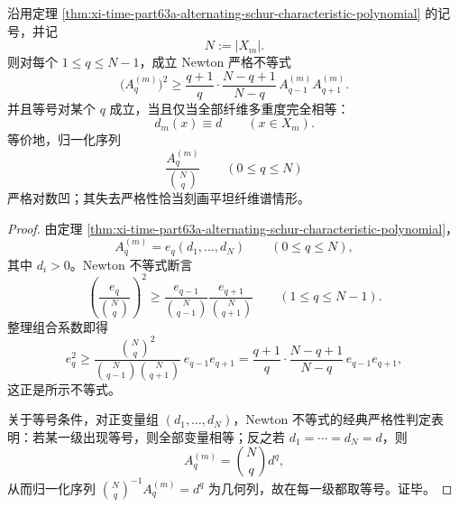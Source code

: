 \begin{theorem}\label{thm:xi-time-part63a-alternating-schur-newton-rigidity}
沿用定理 \ref{thm:xi-time-part63a-alternating-schur-characteristic-polynomial} 的记号，并记
\[
N:=|X_m|.
\]
则对每个 \(1\le q\le N-1\)，成立 Newton 严格不等式
\[
\boxed{\;
\bigl(A_q^{(m)}\bigr)^2
\ge
\frac{q+1}{q}\cdot \frac{N-q+1}{N-q}\,
A_{q-1}^{(m)}A_{q+1}^{(m)}.\;}
\]
并且等号对某个 \(q\) 成立，当且仅当全部纤维多重度完全相等：
\[
d_m(x)\equiv d
\qquad (x\in X_m).
\]
等价地，归一化序列
\[
\frac{A_q^{(m)}}{\binom{N}{q}}
\qquad(0\le q\le N)
\]
严格对数凹；其失去严格性恰当刻画平坦纤维谱情形。
\end{theorem}
\begin{proof}
由定理 \ref{thm:xi-time-part63a-alternating-schur-characteristic-polynomial}，
\[
A_q^{(m)}=e_q(d_1,\dots,d_N)
\qquad(0\le q\le N),
\]
其中 \(d_i>0\)。Newton 不等式断言
\[
\left(\frac{e_q}{\binom{N}{q}}\right)^2
\ge
\frac{e_{q-1}}{\binom{N}{q-1}}
\frac{e_{q+1}}{\binom{N}{q+1}}
\qquad(1\le q\le N-1).
\]
整理组合系数即得
\[
e_q^2
\ge
\frac{\binom{N}{q}^2}{\binom{N}{q-1}\binom{N}{q+1}}\,e_{q-1}e_{q+1}
=
\frac{q+1}{q}\cdot\frac{N-q+1}{N-q}\,e_{q-1}e_{q+1},
\]
这正是所示不等式。

关于等号条件，对正变量组 \((d_1,\dots,d_N)\)，Newton 不等式的经典严格性判定表明：若某一级出现等号，则全部变量相等；反之若 \(d_1=\cdots=d_N=d\)，则
\[
A_q^{(m)}=\binom{N}{q}d^q,
\]
从而归一化序列 \(\binom{N}{q}^{-1}A_q^{(m)}=d^q\) 为几何列，故在每一级都取等号。证毕。
\end{proof}

